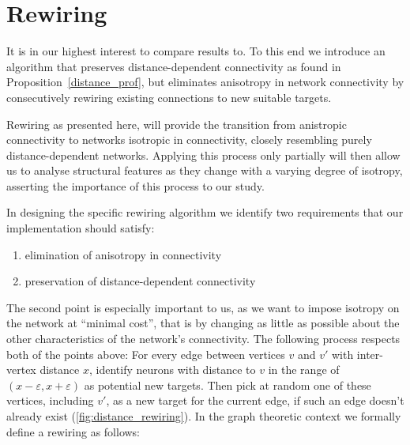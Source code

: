 




\section{Rewiring}\label{sec:rewiring}



It is in our highest interest to compare results to. 
To this end we introduce an algorithm that preserves
distance-dependent connectivity as found in
Proposition~\ref{distance_prof}, but eliminates anisotropy in network
connectivity by consecutively rewiring existing connections to new
suitable targets.


Rewiring as presented here, will provide the transition from
anistropic connectivity to networks isotropic in connectivity, closely
resembling purely distance-dependent networks. Applying this process
only partially will then allow us to analyse structural features as
they change with a varying degree of isotropy, asserting the
importance of this process to our study.

In designing the specific rewiring algorithm we identify two
requirements that our implementation should satisfy:
\vspace{-6pt}
\begin{enumerate}
  \itemsep-11pt
  \item elimination of anisotropy in connectivity 
  \item preservation of distance-dependent connectivity
\end{enumerate}
\vspace{-6pt}%
The second point is especially important to us, as we want to impose
isotropy on the network at \enquote{minimal cost}, that is by changing
as little as possible about the other characteristics of the network's
connectivity. The following process respects both of the points above:
For every edge between vertices $v$ and $v'$ with inter-vertex
distance $x$, identify neurons with distance to $v$ in the range of
$(x-\varepsilon, x+\varepsilon)$ as potential new targets. Then pick
at random one of these vertices, including $v'$, as a new target for
the current edge, if such an edge doesn't already exist
(\autoref{fig:distance_rewiring}). In the graph theoretic context we
formally define a rewiring as follows:

